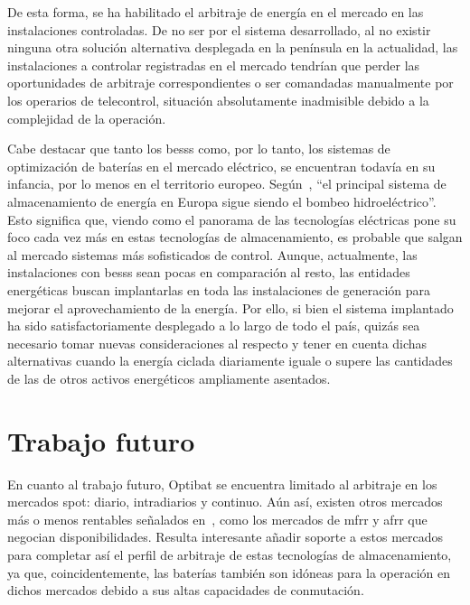 De esta forma, se ha habilitado el arbitraje de energía en el mercado en las instalaciones controladas. De no ser por el sistema desarrollado, al no existir ninguna otra solución alternativa desplegada en la península en la actualidad, las instalaciones a controlar registradas en el mercado tendrían que perder las oportunidades de arbitraje correspondientes o ser comandadas manualmente por los operarios de telecontrol, situación absolutamente inadmisible debido a la complejidad de la operación.

Cabe destacar que tanto los \glspl{bess} como, por lo tanto, los sistemas de optimización de baterías en el mercado eléctrico, se encuentran todavía en su infancia, por lo menos en el territorio europeo. Según~\cite{hu2022119512}, ``el principal sistema de almacenamiento de energía en Europa sigue siendo el bombeo hidroeléctrico''. Esto significa que, viendo como el panorama de las tecnologías eléctricas pone su foco cada vez más en estas tecnologías de almacenamiento, es probable que salgan al mercado sistemas más sofisticados de control. Aunque, actualmente, las instalaciones con \glspl{bess} sean pocas en comparación al resto, las entidades energéticas buscan implantarlas en toda las instalaciones de generación para mejorar el aprovechamiento de la energía. Por ello, si bien el sistema implantado ha sido satisfactoriamente desplegado a lo largo de todo el país, quizás sea necesario tomar nuevas consideraciones al respecto y tener en cuenta dichas alternativas cuando la energía ciclada diariamente iguale o supere las cantidades de las de otros activos energéticos ampliamente asentados.

\section{Trabajo futuro}
\label{makereference8.2}

En cuanto al trabajo futuro, Optibat se encuentra limitado al arbitraje en los mercados spot: diario, intradiarios y continuo. Aún así, existen otros mercados más o menos rentables señalados en~\cite{boe20240425}, como los mercados de \gls{mfrr} y \gls{afrr} que negocian disponibilidades. Resulta interesante añadir soporte a estos mercados para completar así el perfil de arbitraje de estas tecnologías de almacenamiento, ya que, coincidentemente, las baterías también son idóneas para la operación en dichos mercados debido a sus altas capacidades de conmutación.

